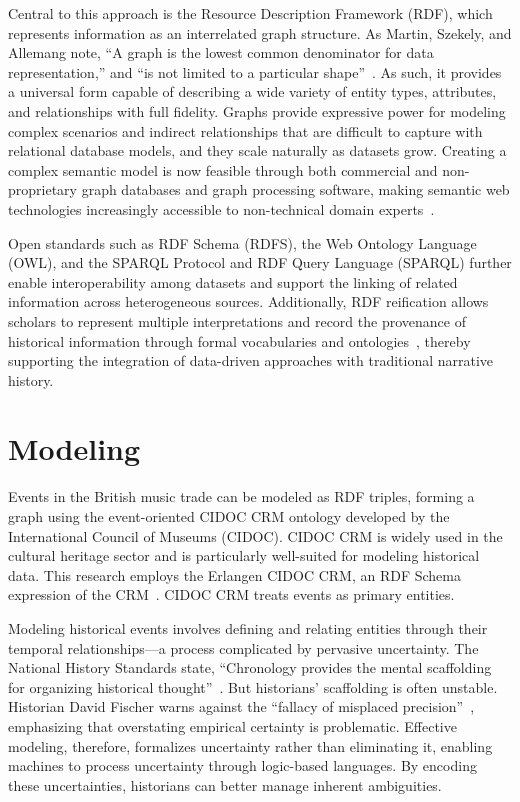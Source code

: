 \documentclass[final]{anthology-ch} %
\begin{document}
Central to this approach is the Resource Description Framework (RDF), which represents information as an interrelated graph structure. As Martin, Szekely, and Allemang note, \enquote{A graph is the lowest common denominator for data representation,} and \enquote{is not limited to a particular shape}~\cite[16]{martin2021rise}. As such, it provides a universal form capable of describing a wide variety of entity types, attributes, and relationships with full fidelity. Graphs provide expressive power for modeling complex scenarios and indirect relationships that are difficult to capture with relational database models, and they scale naturally as datasets grow. Creating a complex semantic model is now feasible through both commercial and non-proprietary graph databases and graph processing software, making semantic web technologies increasingly accessible to non-technical domain experts~\cite[vii]{kejriwal2019domain}.

Open standards such as RDF Schema (RDFS), the Web Ontology Language (OWL), and the SPARQL Protocol and RDF Query Language (SPARQL) further enable interoperability among datasets and support the linking of related information across heterogeneous sources. Additionally, RDF reification allows scholars to represent multiple interpretations and record the provenance of historical information through formal vocabularies and ontologies~\cite[54, 57]{allemang2020semantic}\cite[81-82]{hogan2020web}, thereby supporting the integration of data-driven approaches with traditional narrative history.

\section{Modeling} \label{sec:modeling}

Events in the British music trade can be modeled as RDF triples, forming a graph using the event-oriented CIDOC CRM ontology developed by the International Council of Museums (CIDOC). CIDOC CRM is widely used in the cultural heritage sector and is particularly well-suited for modeling historical data. This research employs the Erlangen CIDOC CRM, an RDF Schema expression of the CRM~\cite{doerr2020implementing}. CIDOC CRM treats events as primary entities.

Modeling historical events involves defining and relating entities through their temporal relationships---a process complicated by pervasive uncertainty. The National History Standards state, \enquote{Chronology provides the mental scaffolding for organizing historical thought}~\cite[7]{nationalhistory1995standards}. But historians' scaffolding is often unstable. Historian David Fischer warns against the \enquote{fallacy of misplaced precision}~\cite[61]{fischer1970historians}, emphasizing that overstating empirical certainty is problematic. Effective modeling, therefore, formalizes uncertainty rather than eliminating it, enabling machines to process uncertainty through logic-based languages. By encoding these uncertainties, historians can better manage inherent ambiguities.
\end{document}

